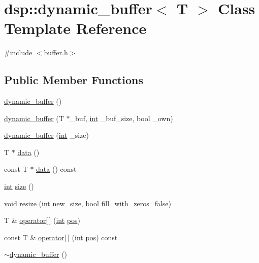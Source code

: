 \hypertarget{classdsp_1_1dynamic__buffer}{}\section{dsp\+:\+:dynamic\+\_\+buffer$<$ T $>$ Class Template Reference}
\label{classdsp_1_1dynamic__buffer}


{\ttfamily \#include $<$buffer.\+h$>$}

\subsection*{Public Member Functions}
\begin{DoxyCompactItemize}
\item 
\hyperlink{classdsp_1_1dynamic__buffer_a748581ae60aad9f3ef18b751700dd640}{dynamic\+\_\+buffer} ()
\item 
\hyperlink{classdsp_1_1dynamic__buffer_a9acd3f9a910db3843c15f252218f33d5}{dynamic\+\_\+buffer} (T $\ast$\+\_\+buf, \hyperlink{tk_8h_a83f82f76e7fed06f4c49d2db94028a6d}{int} \+\_\+buf\+\_\+size, bool \+\_\+own)
\item 
\hyperlink{classdsp_1_1dynamic__buffer_aab21f527b264c8b77384c5406a4d2658}{dynamic\+\_\+buffer} (\hyperlink{tk_8h_a83f82f76e7fed06f4c49d2db94028a6d}{int} \+\_\+size)
\item 
T $\ast$ \hyperlink{classdsp_1_1dynamic__buffer_a9809aeeba0d90a679a153600133a03a5}{data} ()
\item 
const T $\ast$ \hyperlink{classdsp_1_1dynamic__buffer_a333dee51920cd06759dd64bf1feca53f}{data} () const 
\item 
\hyperlink{tk_8h_a83f82f76e7fed06f4c49d2db94028a6d}{int} \hyperlink{classdsp_1_1dynamic__buffer_ab4b47bc63b61aacf805745621cde63d7}{size} ()
\item 
\hyperlink{tk_8h_aba408b7cd755a96426e004c015f5de8e}{void} \hyperlink{classdsp_1_1dynamic__buffer_a06af3bbb073bae8d5f9f567206f5e146}{resize} (\hyperlink{tk_8h_a83f82f76e7fed06f4c49d2db94028a6d}{int} new\+\_\+size, bool fill\+\_\+with\+\_\+zeros=false)
\item 
T \& \hyperlink{classdsp_1_1dynamic__buffer_a615aba921e32730a784f9674fa538b5f}{operator\mbox{[}$\,$\mbox{]}} (\hyperlink{tk_8h_a83f82f76e7fed06f4c49d2db94028a6d}{int} \hyperlink{wn_8c_a1910d262855b71da353ed0d07a6c7823}{pos})
\item 
const T \& \hyperlink{classdsp_1_1dynamic__buffer_ae0d1d8048256f7adb4f0b8c98f01cf21}{operator\mbox{[}$\,$\mbox{]}} (\hyperlink{tk_8h_a83f82f76e7fed06f4c49d2db94028a6d}{int} \hyperlink{wn_8c_a1910d262855b71da353ed0d07a6c7823}{pos}) const 
\item 
\hyperlink{classdsp_1_1dynamic__buffer_a0f2284cd81fe7473f1f251d208fc2c66}{$\sim$dynamic\+\_\+buffer} ()
\end{DoxyCompactItemize}


